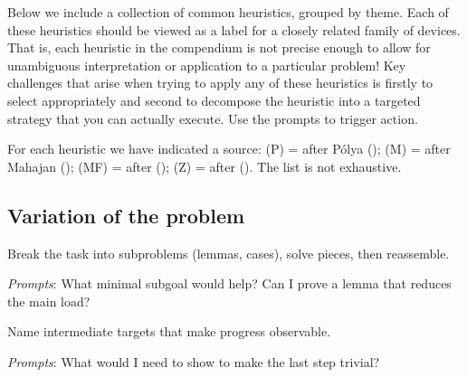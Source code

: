 \documentclass[
  a4paper,
  DIV=11,
  numbers=noendperiod,
  oneside]{scrreprt}
\begin{document}
Below we include a collection of common heuristics, grouped by theme.
Each of these heuristics should be viewed as a label for a closely
related family of devices. That is, each heuristic in the compendium is
not precise enough to allow for unambiguous interpretation or
application to a particular problem! Key challenges that arise when
trying to apply any of these heuristics is firstly to select
appropriately and second to decompose the heuristic into a targeted
strategy that you can actually execute. Use the prompts to trigger
action.

For each heuristic we have indicated a source: (P) = after Pólya
(); (M) = after Mahajan
(); (MF) = after
();
(Z) = after (). The list is not
exhaustive.

\subsection*{Variation of the problem}\label{variation-of-the-problem}

\begin{tcolorbox}[enhanced jigsaw, opacitybacktitle=0.6, breakable, colbacktitle=quarto-callout-note-color!10!white, left=2mm, bottomrule=.15mm, arc=.35mm, colback=white, toptitle=1mm, toprule=.15mm, bottomtitle=1mm, opacityback=0, colframe=quarto-callout-note-color-frame, coltitle=black, rightrule=.15mm, titlerule=0mm, leftrule=.75mm, title={Decomposing and recombining (P, Z)}]

Break the task into subproblems (lemmas, cases), solve pieces, then
reassemble.

\emph{Prompts}: What minimal subgoal would help? Can I prove a lemma
that reduces the main load?

\end{tcolorbox}

\begin{tcolorbox}[enhanced jigsaw, opacitybacktitle=0.6, breakable, colbacktitle=quarto-callout-note-color!10!white, left=2mm, bottomrule=.15mm, arc=.35mm, colback=white, toptitle=1mm, toprule=.15mm, bottomtitle=1mm, opacityback=0, colframe=quarto-callout-note-color-frame, coltitle=black, rightrule=.15mm, titlerule=0mm, leftrule=.75mm, title={Establishing and using subgoals (P, Z)}]

Name intermediate targets that make progress observable.

\emph{Prompts}: What would I need to show to make the last step trivial?

\end{tcolorbox}
\end{document}
